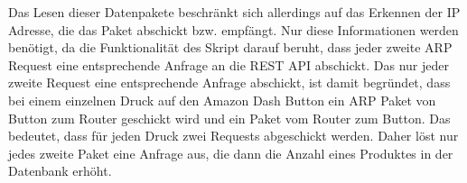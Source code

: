 Das Lesen dieser Datenpakete beschränkt sich allerdings auf das Erkennen der \ac{IP} Adresse, die das Paket abschickt bzw. empfängt. Nur diese Informationen werden benötigt, da die Funktionalität des Skript darauf beruht, dass jeder zweite \ac{ARP} Request eine entsprechende Anfrage an die \ac{REST} \ac{API} abschickt. Das nur jeder zweite Request eine entsprechende Anfrage abschickt, ist damit begründet, dass bei einem einzelnen Druck auf den Amazon Dash Button ein \ac{ARP} Paket von Button zum Router geschickt wird und ein Paket vom Router zum Button. Das bedeutet, dass für jeden Druck zwei Requests abgeschickt werden. Daher löst nur jedes zweite Paket eine Anfrage aus, die dann die Anzahl eines Produktes in der Datenbank erhöht. 